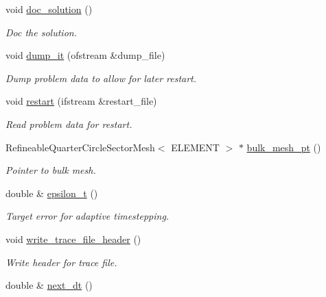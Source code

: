 \begin{DoxyCompactItemize}
void \hyperlink{classRefineableUnsteadyHeatProblem_a77d590171785b6b5f4070af9401c0e37}{doc\+\_\+solution} ()
\begin{DoxyCompactList}\small\item\em Doc the solution. \end{DoxyCompactList}\item 
void \hyperlink{classRefineableUnsteadyHeatProblem_a1fb939c3f9c258fd49328bb1516ced98}{dump\+\_\+it} (ofstream \&dump\+\_\+file)
\begin{DoxyCompactList}\small\item\em Dump problem data to allow for later restart. \end{DoxyCompactList}\item 
void \hyperlink{classRefineableUnsteadyHeatProblem_af36fa71e72852367411e21b50b179625}{restart} (ifstream \&restart\+\_\+file)
\begin{DoxyCompactList}\small\item\em Read problem data for restart. \end{DoxyCompactList}\item 
Refineable\+Quarter\+Circle\+Sector\+Mesh$<$ E\+L\+E\+M\+E\+NT $>$ $\ast$ \hyperlink{classRefineableUnsteadyHeatProblem_a4d8eec1505a3c53960a3182ec462b4e7}{bulk\+\_\+mesh\+\_\+pt} ()
\begin{DoxyCompactList}\small\item\em Pointer to bulk mesh. \end{DoxyCompactList}\item 
double \& \hyperlink{classRefineableUnsteadyHeatProblem_a7ae8870014736809c45ccf7ab6b0b684}{epsilon\+\_\+t} ()
\begin{DoxyCompactList}\small\item\em Target error for adaptive timestepping. \end{DoxyCompactList}\item 
void \hyperlink{classRefineableUnsteadyHeatProblem_a94d7869ed87708a3736a7c42959cbfcc}{write\+\_\+trace\+\_\+file\+\_\+header} ()
\begin{DoxyCompactList}\small\item\em Write header for trace file. \end{DoxyCompactList}\item 
double \& \hyperlink{classRefineableUnsteadyHeatProblem_af33179cc377ae40e4d229aebcd8ade8e}{next\+\_\+dt} ()
\end{DoxyCompactItemize}

